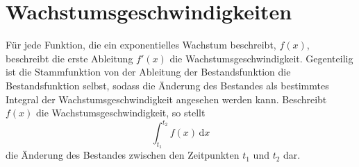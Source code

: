 \documentclass{article}
\begin{document}
\section{Wachstumsgeschwindigkeiten}
Für jede Funktion, die ein exponentielles Wachstum beschreibt, $f(x)$, beschreibt die erste Ableitung $f'(x)$ die Wachstumsgeschwindigkeit. \newline
Gegenteilig ist die Stammfunktion von der Ableitung der Bestandsfunktion die Bestandsfunktion selbst, sodass die Änderung des Bestandes als bestimmtes Integral der Wachstumsgeschwindigkeit angesehen werden kann. Beschreibt $f(x)$ die Wachstumsgeschwindigkeit, so stellt
\[
 \int_{t_1}^{t_2} f(x) \,\mathrm{d}x 
\]
die Änderung des Bestandes zwischen den Zeitpunkten $t_1$ und $t_2$ dar. 
 
\end{document}
